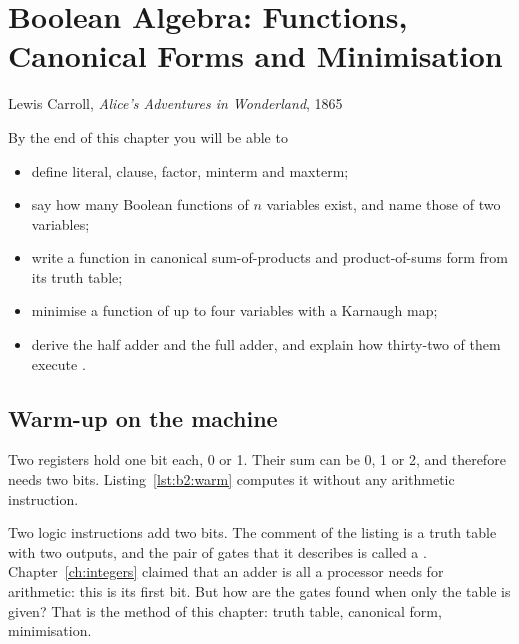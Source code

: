 \chapter{Boolean Algebra: Functions, Canonical Forms and Minimisation}
\label{ch:boole2}

  {Lewis Carroll, \emph{Alice's Adventures in Wonderland}, 1865}

\begin{chapgoals}
By the end of this chapter you will be able to
\begin{itemize}
\item define literal, clause, factor, minterm and maxterm;
\item say how many Boolean functions of $n$ variables exist, and name those of two variables;
\item write a function in canonical sum-of-products and product-of-sums form from its truth table;
\item minimise a function of up to four variables with a Karnaugh map;
\item derive the half adder and the full adder, and explain how thirty-two of them execute .
\end{itemize}
\end{chapgoals}


\section{Warm-up on the machine}

Two registers hold one bit each, 0 or 1. Their sum can be 0, 1 or 2, and
therefore needs two bits. Listing~\ref{lst:b2:warm} computes it without any
arithmetic instruction.


Two logic instructions add two bits. The comment of the listing is a truth
table with two outputs, and the pair of gates that it describes is called a
. Chapter~\ref{ch:integers} claimed that an adder is all a
processor needs for arithmetic: this is its first bit. But how are the gates
found when only the table is given? That is the method of this chapter:
truth table, canonical form, minimisation.

